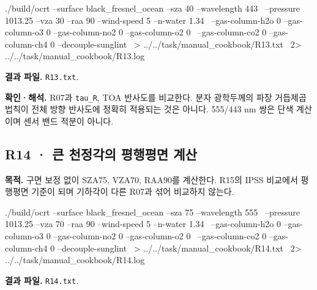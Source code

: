 \noindent\begin{minipage}{\linewidth}
\begin{ManualCode}

./build/ocrt --surface black_fresnel_ocean --sza 40 --wavelength 443 \
  --pressure 1013.25 --vza 30 --raa 90 --wind-speed 5 --n-water 1.34 \
  --gas-column-h2o 0 --gas-column-o3 0 --gas-column-no2 0 --gas-column-o2 0 \
  --gas-column-co2 0 --gas-column-ch4 0 --decouple-sunglint \
  > ../../task/manual_cookbook/R13.txt \
  2> ../../task/manual_cookbook/R13.log

\end{ManualCode}
\end{minipage}\par

\textbf{결과 파일. }\texttt{R13.txt}.

\textbf{확인·해석. }R07과 \texttt{tau\_\allowbreak{}R}, TOA 반사도를 비교한다. 분자 광학두께의 파장 거듭제곱 법칙이 전체 방향 반사도에 정확히 적용되는 것은 아니다. 555/443 nm 쌍은 단색 계산이며 센서 밴드 적분이 아니다.


\subsection{R14 · 큰 천정각의 평행평면 계산}
\label{sec:auto:09_cookbook:3.8}

\label{recipe:R14}

\textbf{목적. }구면 보정 없이 SZA75\textdegree{}, VZA70\textdegree{}, RAA90\textdegree{}를 계산한다. R15의 IPSS 비교에서 평행평면 기준이 되며 기하각이 다른 R07과 섞어 비교하지 않는다.

\noindent\begin{minipage}{\linewidth}
\begin{ManualCode}

./build/ocrt --surface black_fresnel_ocean --sza 75 --wavelength 555 \
  --pressure 1013.25 --vza 70 --raa 90 --wind-speed 5 --n-water 1.34 \
  --gas-column-h2o 0 --gas-column-o3 0 --gas-column-no2 0 --gas-column-o2 0 \
  --gas-column-co2 0 --gas-column-ch4 0 --decouple-sunglint \
  > ../../task/manual_cookbook/R14.txt \
  2> ../../task/manual_cookbook/R14.log

\end{ManualCode}
\end{minipage}\par

\textbf{결과 파일. }\texttt{R14.txt}.

